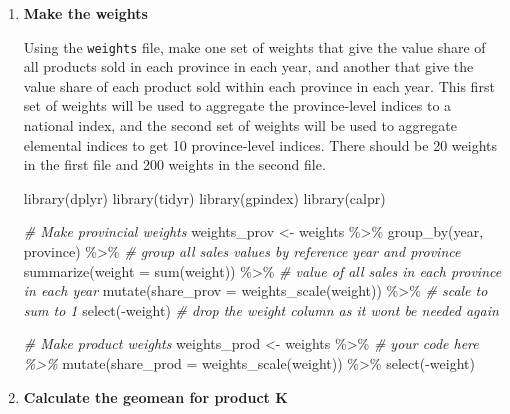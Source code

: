 \documentclass[
]{article}
\newenvironment{Shaded}{\begin{snugshade}}{\end{snugshade}}
\newcommand{\AttributeTok}[1]{\textcolor[rgb]{0.77,0.63,0.00}{#1}}
\newcommand{\CommentTok}[1]{\textcolor[rgb]{0.56,0.35,0.01}{\textit{#1}}}
\newcommand{\FunctionTok}[1]{\textcolor[rgb]{0.00,0.00,0.00}{#1}}
\newcommand{\NormalTok}[1]{#1}
\newcommand{\OtherTok}[1]{\textcolor[rgb]{0.56,0.35,0.01}{#1}}
\newcommand{\SpecialCharTok}[1]{\textcolor[rgb]{0.00,0.00,0.00}{#1}}
\begin{document}
\begin{enumerate}
\def\labelenumi{\arabic{enumi}.}
\item
  \textbf{Make the weights}

  Using the \texttt{weights} file, make one set of weights that give the value share of all products sold in each province in each year, and another that give the value share of each product sold within each province in each year. This first set of weights will be used to aggregate the province-level indices to a national index, and the second set of weights will be used to aggregate elemental indices to get 10 province-level indices. There should be 20 weights in the first file and 200 weights in the second file.

\begin{Shaded}
\begin{Highlighting}[]
\FunctionTok{library}\NormalTok{(dplyr)}
\FunctionTok{library}\NormalTok{(tidyr)}
\FunctionTok{library}\NormalTok{(gpindex)}
\FunctionTok{library}\NormalTok{(calpr)}

\CommentTok{\# Make provincial weights}
\NormalTok{weights\_prov }\OtherTok{\textless{}{-}}\NormalTok{ weights }\SpecialCharTok{\%\textgreater{}\%}
  \FunctionTok{group\_by}\NormalTok{(year, province) }\SpecialCharTok{\%\textgreater{}\%} \CommentTok{\# group all sales values by reference year and province}
  \FunctionTok{summarize}\NormalTok{(}\AttributeTok{weight =} \FunctionTok{sum}\NormalTok{(weight)) }\SpecialCharTok{\%\textgreater{}\%} \CommentTok{\# value of all sales in each province in each year}
  \FunctionTok{mutate}\NormalTok{(}\AttributeTok{share\_prov =} \FunctionTok{weights\_scale}\NormalTok{(weight)) }\SpecialCharTok{\%\textgreater{}\%} \CommentTok{\# scale to sum to 1}
  \FunctionTok{select}\NormalTok{(}\SpecialCharTok{{-}}\NormalTok{weight) }\CommentTok{\# drop the weight column as it won\textquotesingle{}t be needed again}

\CommentTok{\# Make product weights}
\NormalTok{weights\_prod }\OtherTok{\textless{}{-}}\NormalTok{ weights }\SpecialCharTok{\%\textgreater{}\%}
  \CommentTok{\# your code here \%\textgreater{}\%}
  \FunctionTok{mutate}\NormalTok{(}\AttributeTok{share\_prod =} \FunctionTok{weights\_scale}\NormalTok{(weight)) }\SpecialCharTok{\%\textgreater{}\%}
  \FunctionTok{select}\NormalTok{(}\SpecialCharTok{{-}}\NormalTok{weight)}
\end{Highlighting}
\end{Shaded}
\item
  \textbf{Calculate the geomean for product K}


\end{enumerate}
\end{document}
